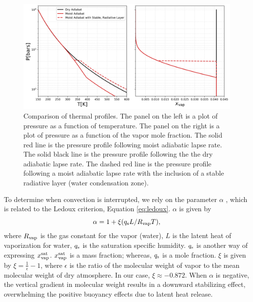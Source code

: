 \documentclass[11pt]{ucscthesisbs}
\begin{document}
\begin{figure}[ht!]
 \centerline{
  \includegraphics[width=\columnwidth]{figures/comparison_dry_vs_moist_lapse_rates.png}
 }
\caption[A Standard Interior Structure Model]
{Comparison of thermal profiles. The panel on the left is a plot of pressure as a function of temperature. The panel on the right is a plot of pressure as a function of the vapor mole fraction. The solid red line is the pressure profile following moist adiabatic lapse rate. The solid black line is the pressure profile following the the dry adiabatic lapse rate. The dashed red line is the pressure profile following a moist adiabatic lapse rate with the inclusion of a stable radiative layer (water condensation zone).} 
\label{fig:comparison_adiabatic_profiles}
\end{figure}
To determine when convection is interrupted, we rely on the parameter $\alpha$ \citep{friedson_2017}, which is related to the Ledoux criterion, Equation \ref{eq:ledoux}. $\alpha$ is given by
\begin{equation}
  \alpha = 1 + \xi (q_{\rm s} L / R_{\rm vap} T) ,
  \label{eq:alpha}
\end{equation}
where $R_{\rm vap}$ is the gas constant for the vapor (water), $L$ is the latent heat of vaporization for water, $q_{\rm s}$ is the saturation specific humidity. $q_{\rm s}$ is another way of expressing $x_{\rm vap}^{\rm sat}$. $x_{\rm vap}^{\rm sat}$ is a mass fraction; whereas, $q_{\rm s}$ is a mole fraction. $\xi$ is given by $\xi = \frac{1}{\epsilon} - 1$, where $\epsilon$ is the ratio of the molecular weight of vapor to the mean molecular weight of dry atmosphere. In our case, $\xi \approx -0.872$. When $\alpha$ is negative, the vertical gradient in molecular weight results in a downward stabilizing effect, overwhelming the positive buoyancy effects due to latent heat release.
\end{document}
